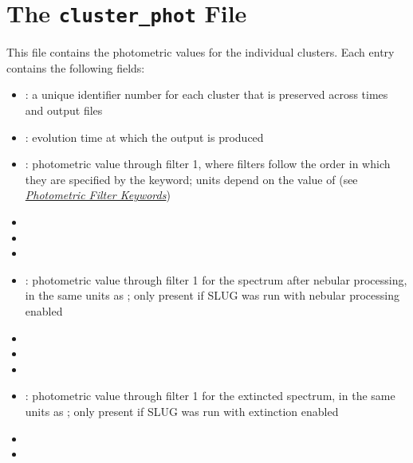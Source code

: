 \documentclass[letterpaper,10pt,english]{sphinxmanual}
\begin{document}
\section{The \texttt{cluster\_phot} File}
\label{output:the-cluster-phot-file}\label{output:ssec-cluster-phot-file}
This file contains the photometric values for the individual clusters. Each entry contains the following fields:
\begin{itemize}
\item {} 
: a unique identifier number for each cluster that is preserved across times and output files

\item {} 
: evolution time at which the output is produced

\item {} 
: photometric value through filter 1, where filters follow the order in which they are specified by the  keyword; units depend on the value of  (see {\hyperref[parameters:ssec\string-phot\string-keywords]{\emph{Photometric Filter Keywords}}})

\item {} 

\item {} 

\item {} 

\item {} 
: photometric value through filter 1 for the spectrum after nebular processing, in the same units as ; only present if SLUG was run with nebular processing enabled

\item {} 

\item {} 

\item {} 

\item {} 
: photometric value through filter 1 for the extincted spectrum, in the same units as ; only present if SLUG was run with extinction enabled

\item {} 

\item {} 


\end{itemize}
\end{document}
